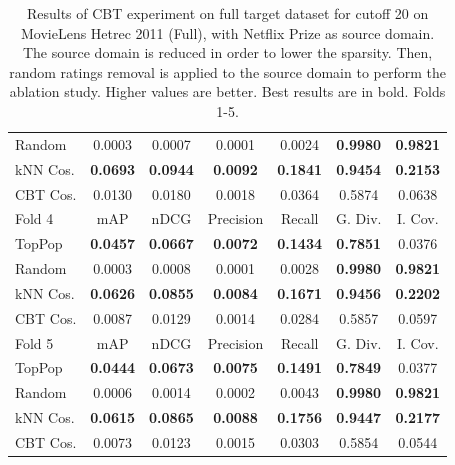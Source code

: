 \begin{table}[hbt]
\begin{tabulary}{\textwidth}{|L|CCCCCC|}
Random & 0.0003 &           0.0007 &           0.0001 &           0.0024 &                                  \textbf{0.9980} &                                   \textbf{0.9821} \\
kNN Cos. & \textbf{0.0693} &  \textbf{0.0944} &  \textbf{0.0092} &  \textbf{0.1841} &                                  \textbf{0.9454} &                                   \textbf{0.2153} \\
CBT Cos. & 0.0130 &           0.0180 &           0.0018 &           0.0364 &                                           0.5874 &                                            0.0638 \\
\hline
\hline
Fold 4 & mAP & nDCG & Precision & Recall & G. Div. & I. Cov. \\
\hline
TopPop & \textbf{0.0457} &  \textbf{0.0667} &  \textbf{0.0072} &  \textbf{0.1434} &                                  \textbf{0.7851} &                                            0.0376 \\
Random & 0.0003 &           0.0008 &           0.0001 &           0.0028 &                                  \textbf{0.9980} &                                   \textbf{0.9821} \\
kNN Cos. & \textbf{0.0626} &  \textbf{0.0855} &  \textbf{0.0084} &  \textbf{0.1671} &                                  \textbf{0.9456} &                                   \textbf{0.2202} \\
CBT Cos. & 0.0087 &           0.0129 &           0.0014 &           0.0284 &                                           0.5857 &                                            0.0597 \\
\hline
\hline
Fold 5 & mAP & nDCG & Precision & Recall & G. Div. & I. Cov. \\
\hline
TopPop & \textbf{0.0444} &  \textbf{0.0673} &  \textbf{0.0075} &  \textbf{0.1491} &                                  \textbf{0.7849} &                                            0.0377 \\
Random & 0.0006 &           0.0014 &           0.0002 &           0.0043 &                                  \textbf{0.9980} &                                   \textbf{0.9821} \\
kNN Cos. & \textbf{0.0615} &  \textbf{0.0865} &  \textbf{0.0088} &  \textbf{0.1756} &                                  \textbf{0.9447} &                                   \textbf{0.2177} \\
CBT Cos. & 0.0073 &           0.0123 &           0.0015 &           0.0303 &                                           0.5854 &                                            0.0544 \\
\hline
\end{tabulary}
\caption{Results of CBT experiment on full target dataset for cutoff 20 on MovieLens Hetrec 2011 (Full), with Netflix Prize as source domain. The source domain is reduced in order to lower the sparsity. Then, random ratings removal is applied to the source domain to perform the ablation study. Higher values are better. Best results are in bold. Folds 1-5.}
\end{table}

